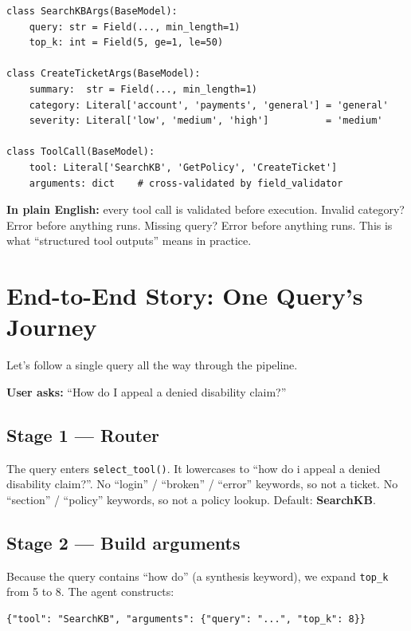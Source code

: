 \documentclass[11pt,a4paper]{article}
\begin{document}
\begin{lstlisting}
class SearchKBArgs(BaseModel):
    query: str = Field(..., min_length=1)
    top_k: int = Field(5, ge=1, le=50)

class CreateTicketArgs(BaseModel):
    summary:  str = Field(..., min_length=1)
    category: Literal['account', 'payments', 'general'] = 'general'
    severity: Literal['low', 'medium', 'high']          = 'medium'

class ToolCall(BaseModel):
    tool: Literal['SearchKB', 'GetPolicy', 'CreateTicket']
    arguments: dict    # cross-validated by field_validator
\end{lstlisting}

\textbf{In plain English:} every tool call is validated before execution. Invalid category? Error before anything runs. Missing query? Error before anything runs. This is what ``structured tool outputs'' means in practice.

\clearpage
\section{End-to-End Story: One Query's Journey}
\label{sec:story}

Let's follow a single query all the way through the pipeline.

\textbf{User asks:} ``How do I appeal a denied disability claim?''

\subsection{Stage 1 --- Router}

The query enters \texttt{select\_tool()}. It lowercases to ``how do i appeal a denied disability claim?''. No ``login'' / ``broken'' / ``error'' keywords, so not a ticket. No ``section'' / ``policy'' keywords, so not a policy lookup. Default: \textbf{SearchKB}.

\subsection{Stage 2 --- Build arguments}

Because the query contains ``how do'' (a synthesis keyword), we expand \texttt{top\_k} from 5 to 8. The agent constructs:

\begin{lstlisting}
{"tool": "SearchKB", "arguments": {"query": "...", "top_k": 8}}
\end{lstlisting}
\end{document}
